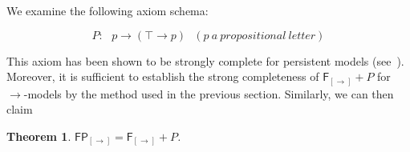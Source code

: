\documentclass[12pt]{article}
\newtheorem{thm}{Theorem}[section]
\newtheorem{lem}[thm]{Lemma}
\newtheorem{dfn}[thm]{Definition}
\begin{document}


We examine the following axiom schema:

$$ P:~~~ p\rightarrow (\top\rightarrow p)~~~ (p ~a ~propositional~ letter)$$


This axiom has been shown to be strongly complete for persistent models (see~\cite{DF2}). Moreover, it is sufficient to establish the strong completeness of ${\mathsf F_{[\rightarrow]}+ P}$ for $\rightarrow$-models by the method used in the previous section. Similarly, we can then claim

\begin{thm}
$\mathsf{FP_{[\rightarrow]}}=\mathsf{F_{[\rightarrow]}}+ P$.
\end{thm}
\end{document}
